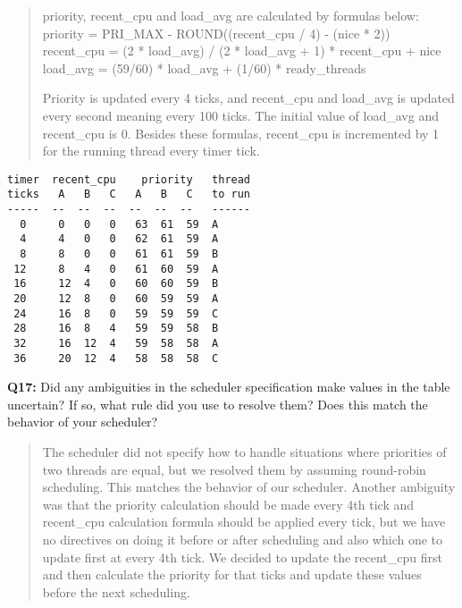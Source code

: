 \documentclass[a4paper,11pt]{paper}
\begin{document}
\begin{quote}
priority, recent\_cpu and load\_avg are calculated by formulas below:\\
priority = PRI\_MAX - ROUND((recent\_cpu / 4) - (nice * 2))\\
recent\_cpu = (2 * load\_avg) / (2 * load\_avg + 1) * recent\_cpu + nice\\
load\_avg = (59/60) * load\_avg + (1/60) * ready\_threads

Priority is updated every 4 ticks, and recent\_cpu and load\_avg is updated every second meaning
every 100 ticks. The initial value of load\_avg and recent\_cpu is 0.
Besides these formulas, recent\_cpu is incremented by 1 for the running thread every timer tick.
\end{quote}

\small
\begin{Verbatim}[frame=single]
timer  recent_cpu    priority   thread
ticks   A   B   C   A   B   C   to run
-----  --  --  --  --  --  --   ------
  0     0   0   0   63  61  59  A  
  4     4   0   0   62  61  59  A
  8     8   0   0   61  61  59  B
 12     8   4   0   61  60  59  A
 16     12  4   0   60  60  59  B 
 20     12  8   0   60  59  59  A 
 24     16  8   0   59  59  59  C
 28     16  8   4   59  59  58  B
 32     16  12  4   59  58  58  A
 36     20  12  4   58  58  58  C
\end{Verbatim}


\textbf{Q17:} Did any ambiguities in the scheduler specification make values in the table uncertain?  If so, what rule did you use to resolve them?  Does this match the behavior of your scheduler?
\begin{quote}
  The scheduler did not specify how to handle situations where priorities of two threads are equal,
but we resolved them by assuming round-robin scheduling. This matches the behavior of our scheduler.
Another ambiguity was that the priority calculation should be made every 4th tick 
and recent\_cpu calculation formula should be applied every tick, but we have no directives on
doing it before or after scheduling and also which one to update first at every 4th tick.
We decided to update the recent\_cpu first and then calculate the priority for that ticks and
update these values before the next scheduling.
\end{quote}
\end{document}
